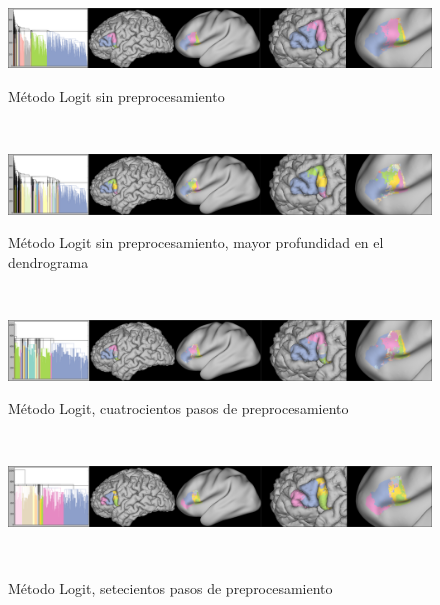 \begin{figure}[h!]
                                                                                                                        
\begin{minipage}[b]{\textwidth}
    \includegraphics[width=\textwidth]{img/broca/logit_0.png}
    \caption{M\'etodo Logit sin preprocesamiento}
    \label{fig:dmri}
\end{minipage} ~
                                                                                                                        
\begin{minipage}[b]{\textwidth}
    \includegraphics[width=\textwidth]{img/broca/logit_0_deep.png}
    \caption{M\'etodo Logit sin preprocesamiento, mayor profundidad en el 
            dendrograma}

\end{minipage} ~

\begin{minipage}[b]{\textwidth}
    \includegraphics[width=\textwidth]{img/broca/logit_400.png}
    \caption{M\'etodo Logit, cuatrocientos pasos de preprocesamiento}

\end{minipage} ~

\begin{minipage}[b]{\textwidth}
    \includegraphics[width=\textwidth]{img/broca/logit_750.png}
    \caption{M\'etodo Logit, setecientos pasos de preprocesamiento}

\end{minipage} ~

\end{figure}



